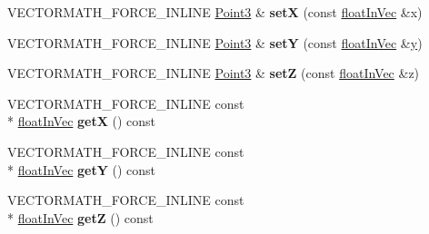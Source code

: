 \begin{DoxyCompactItemize}
\item 
\hypertarget{class_vectormath_1_1_aos_1_1_point3_adb11c88acbfa02d84113257725a1fd93}{V\+E\+C\+T\+O\+R\+M\+A\+T\+H\+\_\+\+F\+O\+R\+C\+E\+\_\+\+I\+N\+L\+I\+N\+E \hyperlink{class_vectormath_1_1_aos_1_1_point3}{Point3} \& {\bfseries set\+X} (const \hyperlink{class_vectormath_1_1float_in_vec}{float\+In\+Vec} \&x)}\label{class_vectormath_1_1_aos_1_1_point3_adb11c88acbfa02d84113257725a1fd93}

\item 
\hypertarget{class_vectormath_1_1_aos_1_1_point3_a4b9dd7dfb7ac6306551abcbcce597ba4}{V\+E\+C\+T\+O\+R\+M\+A\+T\+H\+\_\+\+F\+O\+R\+C\+E\+\_\+\+I\+N\+L\+I\+N\+E \hyperlink{class_vectormath_1_1_aos_1_1_point3}{Point3} \& {\bfseries set\+Y} (const \hyperlink{class_vectormath_1_1float_in_vec}{float\+In\+Vec} \&\hyperlink{_ice_utils_8h_aa7ffaed69623192258fb8679569ff9ba}{y})}\label{class_vectormath_1_1_aos_1_1_point3_a4b9dd7dfb7ac6306551abcbcce597ba4}

\item 
\hypertarget{class_vectormath_1_1_aos_1_1_point3_a954ad20e2ccf5ec7480a308f293d11c0}{V\+E\+C\+T\+O\+R\+M\+A\+T\+H\+\_\+\+F\+O\+R\+C\+E\+\_\+\+I\+N\+L\+I\+N\+E \hyperlink{class_vectormath_1_1_aos_1_1_point3}{Point3} \& {\bfseries set\+Z} (const \hyperlink{class_vectormath_1_1float_in_vec}{float\+In\+Vec} \&z)}\label{class_vectormath_1_1_aos_1_1_point3_a954ad20e2ccf5ec7480a308f293d11c0}

\item 
\hypertarget{class_vectormath_1_1_aos_1_1_point3_aae88961526aa267e3cf04261b0bdbbaa}{V\+E\+C\+T\+O\+R\+M\+A\+T\+H\+\_\+\+F\+O\+R\+C\+E\+\_\+\+I\+N\+L\+I\+N\+E const \\*
\hyperlink{class_vectormath_1_1float_in_vec}{float\+In\+Vec} {\bfseries get\+X} () const }\label{class_vectormath_1_1_aos_1_1_point3_aae88961526aa267e3cf04261b0bdbbaa}

\item 
\hypertarget{class_vectormath_1_1_aos_1_1_point3_a900fa31016f8b4b0713d6b8821befeef}{V\+E\+C\+T\+O\+R\+M\+A\+T\+H\+\_\+\+F\+O\+R\+C\+E\+\_\+\+I\+N\+L\+I\+N\+E const \\*
\hyperlink{class_vectormath_1_1float_in_vec}{float\+In\+Vec} {\bfseries get\+Y} () const }\label{class_vectormath_1_1_aos_1_1_point3_a900fa31016f8b4b0713d6b8821befeef}

\item 
\hypertarget{class_vectormath_1_1_aos_1_1_point3_a8f00a7cf84e96c6fbe9c9ee3889d3b9e}{V\+E\+C\+T\+O\+R\+M\+A\+T\+H\+\_\+\+F\+O\+R\+C\+E\+\_\+\+I\+N\+L\+I\+N\+E const \\*
\hyperlink{class_vectormath_1_1float_in_vec}{float\+In\+Vec} {\bfseries get\+Z} () const }\label{class_vectormath_1_1_aos_1_1_point3_a8f00a7cf84e96c6fbe9c9ee3889d3b9e}


\end{DoxyCompactItemize}
